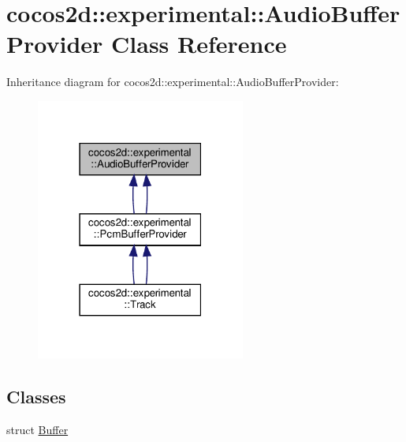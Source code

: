 \hypertarget{classcocos2d_1_1experimental_1_1AudioBufferProvider}{}\section{cocos2d\+:\+:experimental\+:\+:Audio\+Buffer\+Provider Class Reference}
\label{classcocos2d_1_1experimental_1_1AudioBufferProvider}


Inheritance diagram for cocos2d\+:\+:experimental\+:\+:Audio\+Buffer\+Provider\+:
\nopagebreak
\begin{figure}[H]
\begin{center}
\leavevmode
\includegraphics[width=195pt]{classcocos2d_1_1experimental_1_1AudioBufferProvider__inherit__graph}
\end{center}
\end{figure}
\subsection*{Classes}
\begin{DoxyCompactItemize}
\item 
struct \hyperlink{structcocos2d_1_1experimental_1_1AudioBufferProvider_1_1Buffer}{Buffer}
\end{DoxyCompactItemize}
